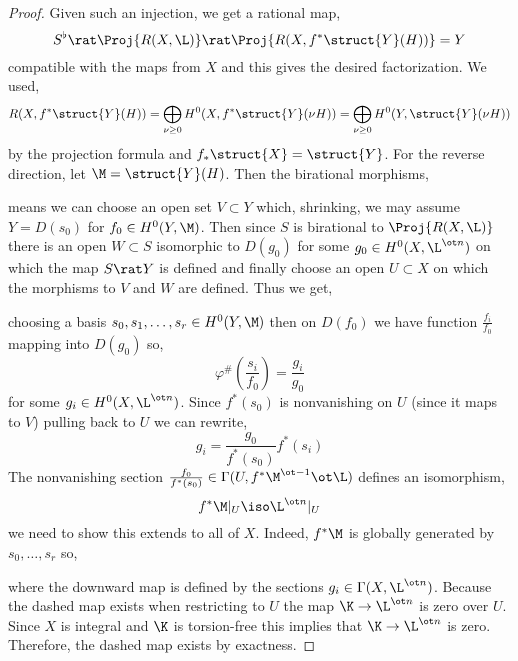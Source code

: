 \documentclass[12pt]{article}
\begin{document}
\begin{proof}
Given such an injection, we get a rational map,
\[ S^\flat \rat \Proj{R(X, \L)} \rat \Proj{R(X, f^* \struct{Y}(H))} = Y \]
compatible with the maps from $X$ and this gives the desired factorization. We used,
\[ R(X, f^* \struct{Y}(H)) = \bigoplus_{\nu \ge 0} H^0(X, f^* \struct{Y}(\nu H)) = \bigoplus_{\nu \ge 0} H^0(Y, \struct{Y}(\nu H)) \]
by the projection formula and $f_* \struct{X} = \struct{Y}$. For the reverse direction, let $\M = \struct{Y}(H)$. Then the birational morphisms,
\begin{center}
\end{center}
means we can choose an open set $V \subset Y$ which, shrinking, we may assume $Y = D(s_0)$ for $f_0 \in H^0(Y, \M)$. Then since $S$ is birational to $\Proj{R(X,\L)}$ there is an open $W \subset S$ isomorphic to $D(g_0)$ for some $g_0 \in H^0(X, \L^{\ot n})$ on which the map $S \rat Y$ is defined and finally choose an open $U \subset X$ on which the morphisms to $V$ and $W$ are defined. Thus we get,
\begin{center}
\end{center}
choosing a basis $s_0, s_1, \dots, s_r \in H^0(Y, \M)$ then on $D(f_0)$ we have function $\frac{f_i}{f_0}$ mapping into $D(g_0)$ so,
\[ \varphi^{\#} \left( \frac{s_i}{f_0} \right) = \frac{g_i}{g_0} \]
for some $g_i \in H^0(X, \L^{\ot n})$. Since $f^*(s_0)$ is nonvanishing on $U$ (since it maps to $V$) pulling back to $U$ we can rewrite,
\[ g_i = \frac{g_0}{f^*(s_0)} f^*(s_i) \]
The nonvanishing section $\frac{f_0}{f^*(s_0)} \in \Gamma(U, f^* \M^{\ot -1} \ot \L)$  defines an isomorphism,
\[ f^* \M|_U \iso \L^{\ot n}|_U \]
we need to show this extends to all of $X$. Indeed, $f^* \M$ is globally generated by $s_0, \dots, s_r$ so,
\begin{center}
\end{center}
where the downward map is defined by the sections $g_i \in \Gamma(X, \L^{\ot n})$. Because the dashed map exists when restricting to $U$ the map $\K \to \L^{\ot n}$ is zero over $U$. Since $X$ is integral and $\K$ is torsion-free this implies that $\K \to \L^{\ot n}$ is zero. Therefore, the dashed map exists by exactness. 
\end{proof}
\end{document}

